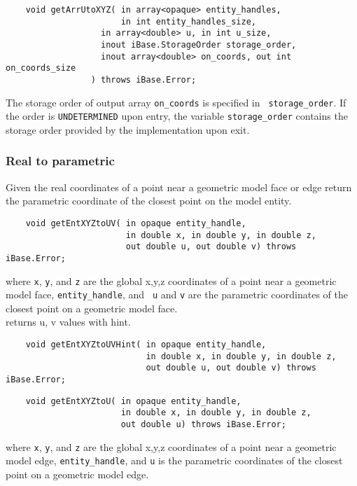 \documentclass{article}
\begin{document}
\begin{verbatim}
    void getArrUtoXYZ( in array<opaque> entity_handles, 
                       in int entity_handles_size, 
         	       in array<double> u, in int u_size,
         	       inout iBase.StorageOrder storage_order,
         	       inout array<double> on_coords, out int on_coords_size
         	     ) throws iBase.Error;
\end{verbatim}
The storage order of output array {\tt on\_coords} is specified in {\tt
  storage\_order}. If the order is {\tt UNDETERMINED} upon entry, the variable
{\tt storage\_order} contains the storage order provided by the implementation upon
exit.

\subsubsection{Real to parametric}
Given the real coordinates of a point near a geometric model 
face or edge return the parametric coordinate of the closest 
point on the model entity.

\begin{verbatim}
    void getEntXYZtoUV( in opaque entity_handle, 
                        in double x, in double y, in double z,
                        out double u, out double v) throws iBase.Error;
\end{verbatim}
where {\tt x}, {\tt y}, and {\tt z} are the global x,y,z coordinates 
of a point near a geometric model face, {\tt entity\_handle}, and {\tt
  u} and {\tt v} are 
the parametric coordinates of the closest point on a geometric 
model face.\\

\hspace{-16pt}{\tt getEntXYZtoUVHint} returns u, v values with hint.
\begin{verbatim}
    void getEntXYZtoUVHint( in opaque entity_handle, 
                            in double x, in double y, in double z,
                            out double u, out double v) throws iBase.Error;
\end{verbatim}			      
			      
\begin{verbatim}
    void getEntXYZtoU( in opaque entity_handle, 
                       in double x, in double y, in double z,
                       out double u) throws iBase.Error;
\end{verbatim}
where {\tt x}, {\tt y}, and {\tt z} are the global x,y,z coordinates 
of a point near a geometric model edge, {\tt entity\_handle}, and {\tt u} is 
the parametric coordinates of the closest point on a geometric 
model edge.\\
\end{document}
